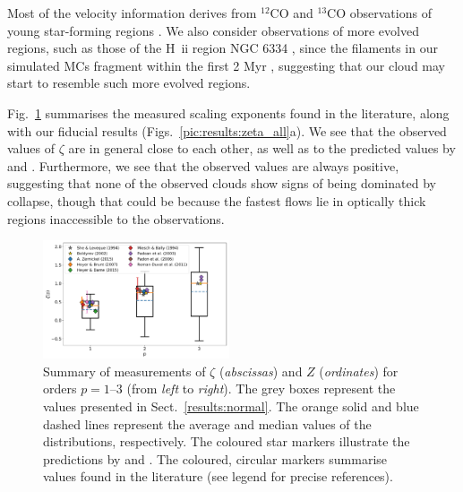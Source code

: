 

Most of the velocity information derives from $^{12}$CO and $^{13}$CO observations of young star-forming regions \citep[e.g., Perseus and Taurus][]{Padoan2003}.
We also consider observations of more evolved regions, such as those of the H~{\sc ii} region NGC 6334 \citep{Zernickel2015}, since the filaments in our simulated MCs fragment within the first 2 Myr , suggesting that our cloud may start to resemble such more evolved regions.

Fig.~\ref{pic:discussion:comp_observation} summarises the measured scaling exponents found in the literature, along with our fiducial results (Figs.~\ref{pic:results:zeta_all}a).
We see that the observed values of $\zeta$ are in general close to each other, as well as to the predicted values by \citet{She1994} and \citet{Boldyrev2002}. 
Furthermore, we see that the observed values are always positive, suggesting that none of the observed clouds show signs of being dominated by collapse, though that could be because the fastest flows lie in optically thick regions inaccessible to the observations.  

\begin{figure}
	\includegraphics[width=0.49\textwidth]{compare_observations.pdf}
	\caption{Summary of measurements of $\zeta$ (\textit{abscissas}) and $Z$ (\textit{ordinates}) for orders $p=1$--3 (from \textit{left} to \textit{right}). The grey boxes represent the values presented in Sect.~\ref{results:normal}. The orange solid and blue dashed lines represent the average and median values of the distributions, respectively. The coloured star markers illustrate the predictions by \citet{She1994} and \citet{Boldyrev2002}. The coloured, circular markers summarise values found in the literature (see legend for precise references).
	}
	\label{pic:discussion:comp_observation}
\end{figure}


